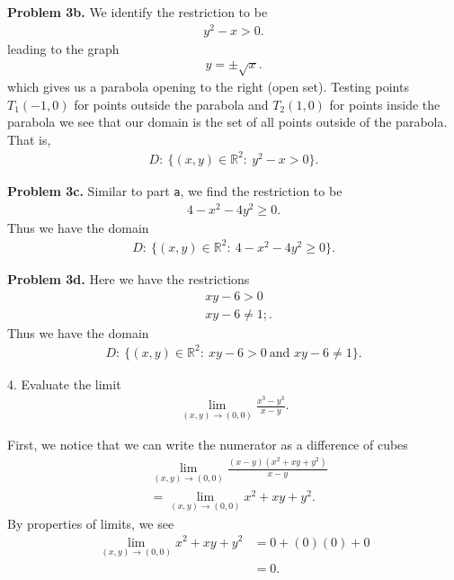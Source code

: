 \documentclass{report}
\begin{document}
    \bigbreak \noindent 
    \textbf{Problem 3b.} We identify the restriction to be
    \begin{align*}
        y^{2} -x > 0
    .\end{align*}
    leading to the graph 
    \begin{align*}
       y = \pm \sqrt{x} 
    .\end{align*}
    which gives us a parabola opening to the right (open set). Testing points $T_{1}(-1,0)$ for points outside the parabola and $T_{2}(1,0)$ for points inside the parabola we see that our domain is the set of all points outside of the parabola. That is,
    \begin{align*}
        D:\ \{(x,y) \in \mathbb{R}^{2}:\ y^{2}-x>0\}
    .\end{align*}

    \pagebreak \bigbreak \noindent 
    \textbf{Problem 3c.} Similar to part \texttt{a}, we find the restriction to be
    \begin{align*}
        4-x^{2}-4y^{2} \geq 0
    .\end{align*}
    Thus we have the domain
    \begin{align*}
        D:\ \{(x,y) \in \mathbb{R}^{2}:\ 4-x^{2}-4y^{2} \geq 0 \}
    .\end{align*}

    \bigbreak \noindent 
    \textbf{Problem 3d.} Here we have the restrictions
    \begin{align*}
        &xy-6 > 0 \\
        &xy-6 \neq 1;
    .\end{align*}
    Thus we have the domain
    \begin{align*}
        D:\ \{(x,y) \in \mathbb{R}^{2}:\ xy-6 > 0\ \text{and } xy-6\neq 1\}
    .\end{align*}

    \bigbreak \noindent 
    \begin{mdframed}
        4. Evaluate the limit
        \begin{align*}
            \lim\limits_{(x,y) \to (0,0)}{\frac{x^{3}-y^{3}}{x-y}}
        .\end{align*}
    \end{mdframed}
    \bigbreak \noindent 
    First, we notice that we can write the numerator as a difference of cubes
    \begin{align*}
        &\lim\limits_{(x,y) \to (0,0)}{\frac{(x-y)(x^{2}+xy+y^{2})}{x-y}} \\
        &=\lim\limits_{(x,y) \to (0,0)}{x^{2}+xy+y^{2}}
    .\end{align*}
    By properties of limits, we see
    \begin{align*}
        \lim\limits_{(x,y) \to (0,0)}{x^{2}+xy+y^{2}} &= 0+(0)(0)+0 \\
        &=0
    .\end{align*}
\end{document}
